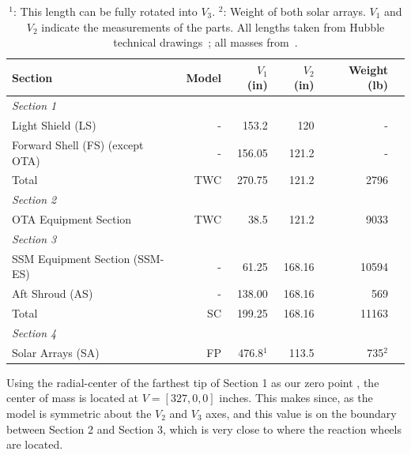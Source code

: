 \documentclass[onecolumn,10pt]{jhwhw}
\begin{document}
\begin{table}[h!]
\begin{center}
\begin{tabular}{l r r r r r}
\toprule
Section & Model & $V_1$ (in) & $V_2$ (in) & Weight (lb) \\
\midrule
\it{Section 1} & & & & \\
\hspace{1em} Light Shield (LS)   & - & 153.2  & 120  & - \\
\hspace{1em} Forward Shell (FS) (except OTA)  & - & 156.05 & 121.2 & - \\
\hspace{1em} Total  & TWC & 270.75 & 121.2 & 2796 \\
\it{Section 2} & & & & \\
\hspace{1em} OTA Equipment Section  & TWC & 38.5 & 121.2 & 9033 \\
\it{Section 3} & & & & \\
\hspace{1em} SSM Equipment Section (SSM-ES) & - &  61.25  &  168.16 & 10594\\
\hspace{1em} Aft Shroud (AS) & - &  138.00  &  168.16 & 569\\
\hspace{1em} Total  & SC & 199.25 & 168.16 & 11163 \\
\it{Section 4} & & & & \\
\hspace{1em} Solar Arrays (SA) & FP &  476.8$^1$  &  113.5 & 735$^2$\\
\bottomrule
\end{tabular}
\end{center}
\caption{$^1$: This length can be fully rotated into $V_3$. $^2$: Weight of both solar arrays. $V_1$ and $V_2$ indicate the measurements of the parts. All lengths taken from Hubble technical drawings~\cite{hst}; all masses from~\cite{mil}.}
\label{properties}
\end{table}

\clearpage
{}

Using the radial-center of the farthest tip of Section 1 as our zero point , the center of mass is located at $V = [327, 0, 0]$ inches. This makes since, as the model is symmetric about the $V_2$ and $V_3$ axes, and this value is on the boundary between Section 2 and Section 3, which is very close to where the reaction wheels are located.
\end{document}
